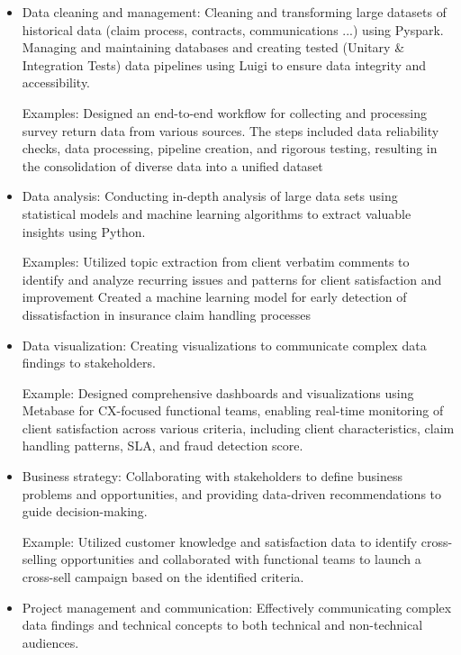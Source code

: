 \documentclass[10pt,letter,ragged2e,withhyper]{altacv}
\begin{document}
\begin{paracol}{2}



\begin{itemize}
  \item Data cleaning and management: Cleaning and transforming large datasets of historical data (claim process, contracts, communications ...) using Pyspark. Managing and maintaining databases and creating tested (Unitary \& Integration Tests) data pipelines using Luigi to ensure data integrity and accessibility.

 Examples: Designed an end-to-end workflow for collecting and processing survey return data from various sources. The steps included data reliability checks, data processing, pipeline creation, and rigorous testing, resulting in the consolidation of diverse data into a unified dataset
  \item Data analysis: Conducting in-depth analysis of large data sets using statistical models and machine learning algorithms to extract valuable insights using Python.

 Examples: Utilized topic extraction from client verbatim comments to identify and analyze recurring issues and patterns for client satisfaction and improvement Created a machine learning model for early detection of dissatisfaction in insurance claim handling processes 
  \item Data visualization: Creating visualizations to communicate complex data findings to stakeholders.

 Example: Designed comprehensive dashboards and visualizations using Metabase for CX-focused functional teams, enabling real-time monitoring of client satisfaction across various criteria, including client characteristics, claim handling patterns, SLA, and fraud detection score. 
  \item Business strategy: Collaborating with stakeholders to define business problems and opportunities, and providing data-driven recommendations to guide decision-making.

 Example: Utilized customer knowledge and satisfaction data to identify cross-selling opportunities and collaborated with functional teams to launch a cross-sell campaign based on the identified criteria. 
  \item Project management and communication: Effectively communicating complex data findings and technical concepts to both technical and non-technical audiences.


\end{itemize}
\end{paracol}
\end{document}
